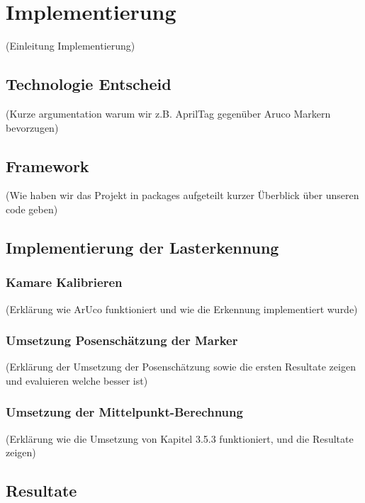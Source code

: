 \section{Implementierung}
(Einleitung Implementierung)

\subsection{Technologie Entscheid}
(Kurze argumentation warum wir z.B. AprilTag gegenüber Aruco Markern bevorzugen)

\subsection{Framework}
(Wie haben wir das Projekt in packages aufgeteilt kurzer Überblick über
unseren code geben)

\subsection{Implementierung der Lasterkennung}


\subsubsection{Kamare Kalibrieren}
(Erklärung wie ArUco funktioniert und wie die Erkennung implementiert wurde)

\subsubsection{Umsetzung Posenschätzung der Marker}
(Erklärung der Umsetzung der Posenschätzung sowie die ersten Resultate zeigen und evaluieren welche besser ist)

\subsubsection{Umsetzung der Mittelpunkt-Berechnung}
(Erklärung wie die Umsetzung von Kapitel 3.5.3 funktioniert, und die Resultate zeigen) 

\subsection{Resultate}



